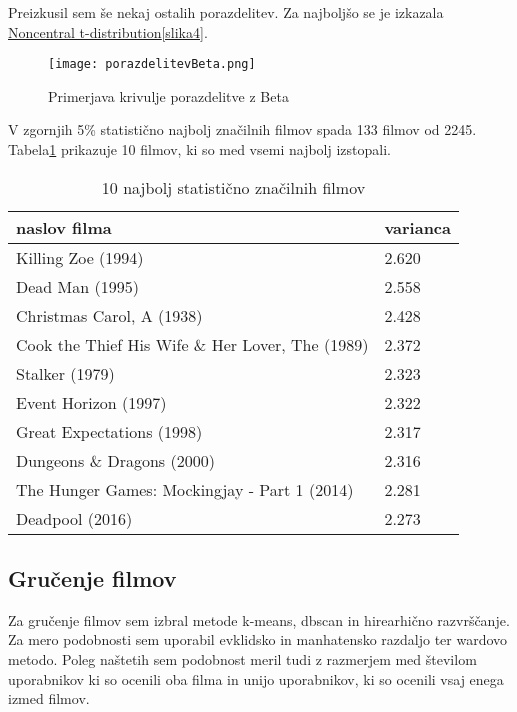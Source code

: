\documentclass[a4paper,11pt]{article}
\begin{document}
Preizkusil sem še nekaj ostalih porazdelitev. Za najboljšo se je izkazala \href{https://en.wikipedia.org/wiki/Noncentral_t-distribution}{Noncentral t-distribution}\ref{slika4}. 


\begin{figure}[htbp]
\begin{center}
\texttt{[image: porazdelitevBeta.png]}
\caption{Primerjava krivulje porazdelitve z Beta}
\label{slika5}
\end{center}
\end{figure}


V zgornjih 5\% statistično najbolj značilnih filmov spada 133 filmov od 2245. Tabela\ref{tab3} prikazuje 10 filmov, ki so med vsemi najbolj izstopali.


\begin{table}[htbp]
\caption{10 najbolj statistično značilnih filmov}
\label{tab3}
\begin{center}
\begin{tabular}{lp{2cm}}
\hline
naslov filma & varianca \\
\hline
Killing Zoe (1994) & 2.620\\
Dead Man (1995) & 2.558 \\
Christmas Carol, A (1938) & 2.428\\
Cook the Thief His Wife \& Her Lover, The (1989) & 2.372 \\
Stalker (1979) & 2.323\\
Event Horizon (1997) & 2.322 \\
Great Expectations (1998) & 2.317 \\
Dungeons \& Dragons (2000) & 2.316 \\
The Hunger Games: Mockingjay - Part 1 (2014) & 2.281 \\
Deadpool (2016) & 2.273 \\
\hline
\end{tabular}
\end{center}
\end{table}

\subsection{Gručenje filmov}
Za gručenje filmov sem izbral metode k-means, dbscan in hirearhično razvrščanje. Za mero podobnosti sem uporabil evklidsko in manhatensko razdaljo ter wardovo metodo. Poleg naštetih sem podobnost meril tudi z razmerjem med številom uporabnikov ki so ocenili oba filma in unijo uporabnikov, ki so ocenili vsaj enega izmed filmov.
\end{document}
